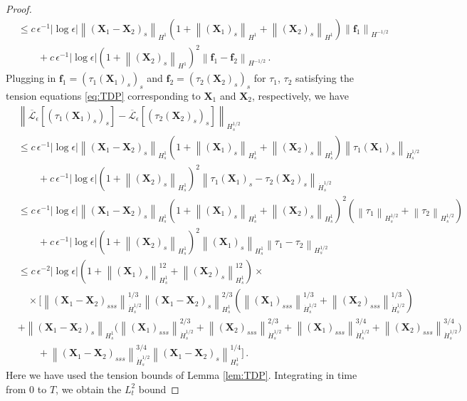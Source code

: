 \documentclass[11pt,reqno]{amsart}
\newcommand{\X}{\bm{X}}
\newcommand{\abs}[1]{\left\lvert #1 \right\rvert}
\newcommand{\norm}[1]{\left\lVert #1 \right\rVert}
\newcommand{\mc}[1]{\mathcal{#1}}
\numberwithin{equation}{section}
\theoremstyle{definition}
\begin{document}
\begin{proof}
\begin{equation}
\begin{aligned}
  &\le c\,\epsilon^{-1}\abs{\log\epsilon}\norm{(\X_1-\X_2)_s}_{H^1}(1+\norm{(\X_1)_s}_{H^1}+\norm{(\X_2)_s}_{H^1})\norm{\bm{f}_1}_{H^{-1/2}}\\
  &\qquad + c\,\epsilon^{-1}\abs{\log\epsilon}(1+\norm{(\X_2)_s}_{H^1})^2\norm{\bm{f}_1-\bm{f}_2}_{H^{-1/2}}\,. 
\end{aligned}
\end{equation}
%
%
Plugging in $\bm{f}_1=(\tau_1(\X_1)_s)_s$ and $\bm{f}_2=(\tau_2(\X_2)_s)_s$ for $\tau_1$, $\tau_2$ satisfying the tension equations \eqref{eq:TDP} corresponding to $\X_1$ and $\X_2$, respectively, we have
\begin{equation}
\begin{aligned}
  &\norm{\overline{\mc{L}}_\epsilon[(\tau_1(\X_1)_s)_s]-\overline{\mc{L}}_\epsilon[(\tau_2(\X_2)_s)_s]}_{H^{1/2}_s} \\
  &\le c\,\epsilon^{-1}\abs{\log\epsilon}\norm{(\X_1-\X_2)_s}_{H^1_s}(1+\norm{(\X_1)_s}_{H^1_s}+\norm{(\X_2)_s}_{H^1_s})\norm{\tau_1(\X_1)_s}_{\dot H^{1/2}_s}\\
  &\qquad + c\,\epsilon^{-1}\abs{\log\epsilon}(1+\norm{(\X_2)_s}_{H^1_s})^2\norm{\tau_1(\X_1)_s-\tau_2(\X_2)_s}_{\dot H^{1/2}_s}\\
  &\le c\,\epsilon^{-1}\abs{\log\epsilon}\norm{(\X_1-\X_2)_s}_{H^1_s}(1+\norm{(\X_1)_s}_{H^1_s}+\norm{(\X_2)_s}_{H^1_s})^2(\norm{\tau_1}_{H^{1/2}_s}+\norm{\tau_2}_{H^{1/2}_s})\\
  &\qquad + c\,\epsilon^{-1}\abs{\log\epsilon}(1+\norm{(\X_2)_s}_{H^1_s})^2\norm{(\X_1)_s}_{H^1_s}\norm{\tau_1-\tau_2}_{H^{1/2}_s}\\
  &\le c\,\epsilon^{-2}\abs{\log\epsilon}(1+\norm{(\X_1)_s}_{H^1_s}^{12}+\norm{(\X_2)_s}_{H^1_s}^{12})\times\\
  &\quad \times \bigg[\norm{(\X_1-\X_2)_{sss}}_{\dot H^{1/2}_s}^{1/3}\norm{(\X_1-\X_2)_s}_{H^1_s}^{2/3}(\norm{(\X_1)_{sss}}_{\dot H^{1/2}_s}^{1/3}+\norm{(\X_2)_{sss}}_{\dot H^{1/2}_s}^{1/3}) \\
  &+ \norm{(\X_1-\X_2)_s}_{H^1_s}\bigg(\norm{(\X_1)_{sss}}_{\dot H^{1/2}_s}^{2/3} + \norm{(\X_2)_{sss}}_{\dot H^{1/2}_s}^{2/3} + \norm{(\X_1)_{sss}}_{\dot H^{1/2}_s}^{3/4}+\norm{(\X_2)_{sss}}_{\dot H^{1/2}_s}^{3/4}\bigg) \\
  &\qquad  + \norm{(\X_1-\X_2)_{sss}}_{\dot H^{1/2}_s}^{3/4}\norm{(\X_1-\X_2)_s}_{H^1_s}^{1/4} \bigg] \,.
\end{aligned}
\end{equation}
Here we have used the tension bounds of Lemma \ref{lem:TDP}. 
%
%
Integrating in time from $0$ to $T$, we obtain the $L^2_t$ bound 

\end{proof}
\end{document}

